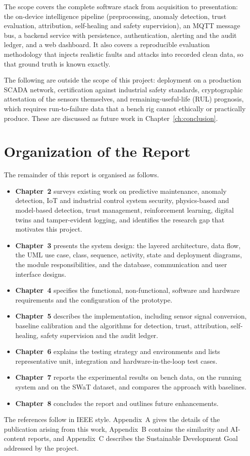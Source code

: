 The scope covers the complete software stack from acquisition to presentation: the on-device intelligence pipeline (preprocessing, anomaly detection, trust evaluation, attribution, self-healing and safety supervision), an MQTT message bus, a backend service with persistence, authentication, alerting and the audit ledger, and a web dashboard. It also covers a reproducible evaluation methodology that injects realistic faults and attacks into recorded clean data, so that ground truth is known exactly.

The following are outside the scope of this project: deployment on a production SCADA network, certification against industrial safety standards, cryptographic attestation of the sensors themselves, and remaining-useful-life (RUL) prognosis, which requires run-to-failure data that a bench rig cannot ethically or practically produce. These are discussed as future work in Chapter~\ref{ch:conclusion}.

\section{Organization of the Report}

The remainder of this report is organised as follows.

\begin{itemize}
  \item \textbf{Chapter~2} surveys existing work on predictive maintenance, anomaly detection, IoT and industrial control system security, physics-based and model-based detection, trust management, reinforcement learning, digital twins and tamper-evident logging, and identifies the research gap that motivates this project.
  \item \textbf{Chapter~3} presents the system design: the layered architecture, data flow, the UML use case, class, sequence, activity, state and deployment diagrams, the module responsibilities, and the database, communication and user interface designs.
  \item \textbf{Chapter~4} specifies the functional, non-functional, software and hardware requirements and the configuration of the prototype.
  \item \textbf{Chapter~5} describes the implementation, including sensor signal conversion, baseline calibration and the algorithms for detection, trust, attribution, self-healing, safety supervision and the audit ledger.
  \item \textbf{Chapter~6} explains the testing strategy and environments and lists representative unit, integration and hardware-in-the-loop test cases.
  \item \textbf{Chapter~7} reports the experimental results on bench data, on the running system and on the SWaT dataset, and compares the approach with baselines.
  \item \textbf{Chapter~8} concludes the report and outlines future enhancements.
\end{itemize}

The references follow in IEEE style. Appendix~A gives the details of the publication arising from this work, Appendix~B contains the similarity and AI-content reports, and Appendix~C describes the Sustainable Development Goal addressed by the project.
